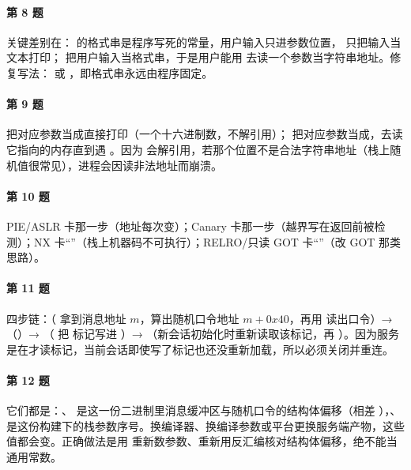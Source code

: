 \documentclass[UTF8,12pt,oneside]{ctexbook}
\begin{document}
\paragraph{第 8 题}关键差别在： 的格式串是程序写死的常量，用户输入只进参数位置， 只把输入当文本打印； 把用户输入当格式串，于是用户能用  去读一个参数当字符串地址。修复写法： 或 ，即格式串永远由程序固定。

\paragraph{第 9 题} 把对应参数当成直接打印（一个十六进制数，不解引用）； 把对应参数当成，去读它指向的内存直到遇 。因为  会解引用，若那个位置不是合法字符串地址（栈上随机值很常见），进程会因读非法地址而崩溃。

\paragraph{第 10 题}PIE/ASLR 卡那一步（地址每次变）；Canary 卡那一步（越界写在返回前被检测）；NX 卡“”（栈上机器码不可执行）；RELRO/只读 GOT 卡“”（改 GOT 那类思路）。

\paragraph{第 11 题}四步链：（ 拿到消息地址 $m$，算出随机口令地址 $m+0x40$，再用  读出口令）→ （）→ （ 把  标记写进 ）→ （新会话初始化时重新读取该标记，再 ）。因为服务是在才读标记，当前会话即使写了标记也还没重新加载，所以必须关闭并重连。

\paragraph{第 12 题}它们都是：、 是这一份二进制里消息缓冲区与随机口令的结构体偏移（相差 ），、 是这份构建下的栈参数序号。换编译器、换编译参数或平台更换服务端产物，这些值都会变。正确做法是用  重新数参数、重新用反汇编核对结构体偏移，绝不能当通用常数。
\end{document}
